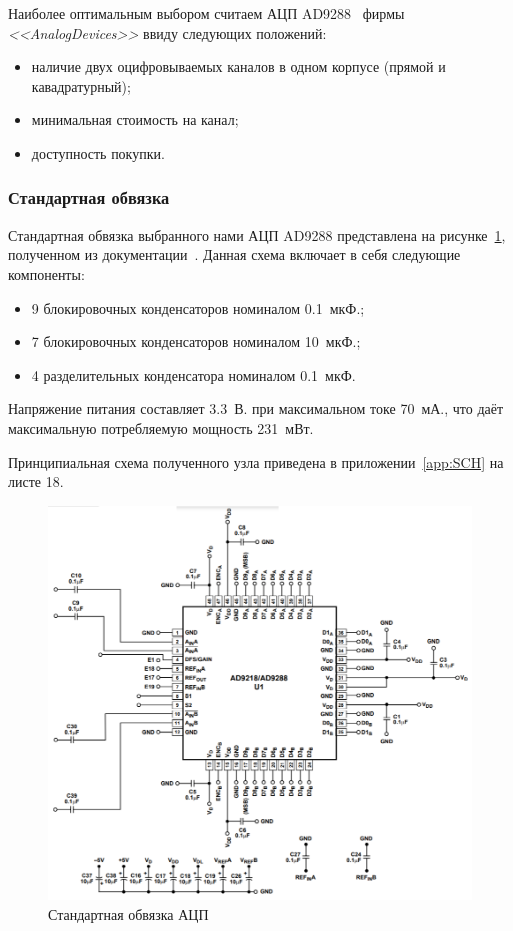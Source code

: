 \documentclass[utf8x, 14pt, oneside, a4paper]{article}
\begin{document}
				
				Наиболее оптимальным выбором считаем АЦП AD9288~\cite{bib:АЦП} фирмы \textit{<<AnalogDevices>>} ввиду следующих положений:
				\begin{itemize}
					\item наличие двух оцифровываемых каналов в одном корпусе (прямой и кавадратурный);
					\item минимальная стоимость на канал;
					\item доступность покупки.
				\end{itemize}
			
			\subsubsection{Стандартная обвязка}
				Стандартная обвязка выбранного нами АЦП AD9288 представлена на рисунке~\ref{fig:обвязка:АЦП}, полученном из документации~\cite{bib:АЦП}. Данная схема включает в себя следующие компоненты:
				\begin{itemize}
					\item 9 блокировочных конденсаторов номиналом 0.1~мкФ.;
					\item 7 блокировочных конденсаторов номиналом 10~мкФ.;
					\item 4 разделительных конденсатора номиналом 0.1~мкФ.
				\end{itemize}
			
				Напряжение питания составляет 3.3~В. при максимальном токе 70~мА., что даёт максимальную потребляемую мощность 231~мВт.
				
				Принципиальная схема полученного узла приведена в приложении~\ref{app:SCH} на листе 18.
				\begin{figure}[h!]
					\centering
					\includegraphics[width=0.7\linewidth]{"Обвязка АЦП"}
					\caption{Стандартная обвязка АЦП}
					\label{fig:обвязка:АЦП}
				\end{figure}
			
\end{document}
